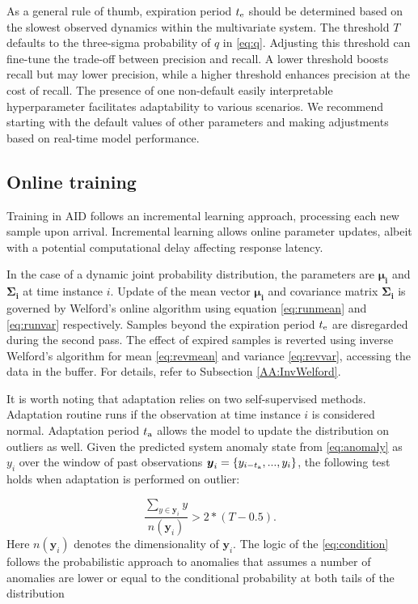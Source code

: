 As a general rule of thumb, expiration period $t _{\text{e}}$ should be determined based on the slowest observed dynamics within the multivariate system. The threshold $T$ defaults to the three-sigma probability of $q$ in \eqref{eq:q}. Adjusting this threshold can fine-tune the trade-off between precision and recall. A lower threshold boosts recall but may lower precision, while a higher threshold enhances precision at the cost of recall. The presence of one non-default easily interpretable hyperparameter facilitates adaptability to various scenarios. We recommend starting with the default values of other parameters and making adjustments based on real-time model performance.

\subsection{Online training}\label{train}
Training in AID follows an incremental learning approach, processing each new sample upon arrival. Incremental learning allows online parameter updates, albeit with a potential computational delay affecting response latency.

In the case of a dynamic joint probability distribution, the parameters are $\boldsymbol{\mu_i}$ and $\boldsymbol{\Sigma_i}$ at time instance \(i\). Update of the mean vector $\boldsymbol{\mu_i}$ and covariance matrix $\boldsymbol{\Sigma_i}$ is governed by Welford's online algorithm using equation \eqref{eq:runmean} and \eqref{eq:runvar} respectively. Samples beyond the expiration period $t _{\text{e}}$ are disregarded during the second pass. The effect of expired samples is reverted using inverse Welford's algorithm for mean \eqref{eq:revmean} and variance \eqref{eq:revvar}, accessing the data in the buffer. For details, refer to Subsection \ref{AA:InvWelford}.

It is worth noting that adaptation relies on two self-supervised methods. Adaptation routine runs if the observation at time instance \(i\) is considered normal. Adaptation period $t _{\text{a}}$ allows the model to update the distribution on outliers as well. Given the predicted system anomaly state from \eqref{eq:anomaly} as $y_i$ over the window of past observations \(\boldsymbol{y}_i=\{y_{i-t _{\text{a}}},...,y_{i}\}\), the following test holds when adaptation is performed on outlier:

\begin{equation}
  {\frac{\sum_{y\in \boldsymbol{y}_i}y}{n(\boldsymbol{y}_i)}} > 2*(T-0.5)\text{.}\label{eq:condition}
\end{equation}
Here \(n(\boldsymbol{y}_i)\) denotes the dimensionality of \(\boldsymbol{y}_i\). The logic of the \eqref{eq:condition} follows the probabilistic approach to anomalies that assumes a number of anomalies are lower or equal to the conditional probability at both tails of the distribution


